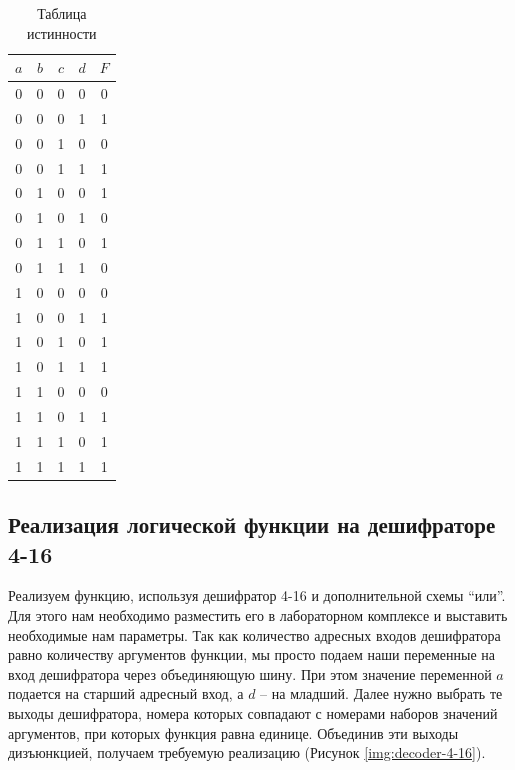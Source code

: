 \documentclass[a4paper]{article}
\begin{document}
	\begin{table}[h] 
		\begin{center}
			\begin{tabular}{ | c | c | c | c | c | }
				\hline
				$ a $ & $ b $ & $ c $ & $ d $ & $ F $ \\
				\hline
				0     & 0     & 0     & 0     & 0     \\
				\hline
				0     & 0     & 0     & 1     & 1     \\
				\hline
				0     & 0     & 1     & 0     & 0     \\
				\hline
				0     & 0     & 1     & 1     & 1     \\
				\hline
				0     & 1     & 0     & 0     & 1     \\
				\hline
				0     & 1     & 0     & 1     & 0     \\
				\hline
				0     & 1     & 1     & 0     & 1     \\
				\hline
				0     & 1     & 1     & 1     & 0     \\
				\hline
				1     & 0     & 0     & 0     & 0     \\
				\hline
				1     & 0     & 0     & 1     & 1     \\
				\hline
				1     & 0     & 1     & 0     & 1     \\
				\hline
				1     & 0     & 1     & 1     & 1     \\
				\hline
				1     & 1     & 0     & 0     & 0     \\
				\hline
				1     & 1     & 0     & 1     & 1     \\
				\hline
				1     & 1     & 1     & 0     & 1     \\
				\hline
				1     & 1     & 1     & 1     & 1     \\
				\hline
			\end{tabular}
		\end{center}
		\caption{Таблица истинности}
		\label{tab:truth}
	\end{table}
	
	\subsection{Реализация логической функции на дешифраторе 4-16}
	Реализуем функцию, используя дешифратор 4-16 и дополнительной схемы “или”. Для этого нам необходимо разместить его в лабораторном комплексе и выставить необходимые нам параметры. Так как количество адресных входов дешифратора равно количеству аргументов функции, мы просто подаем наши переменные на вход дешифратора через объединяющую шину. При этом значение переменной $ a $ подается на старший адресный вход, а $ d $ – на младший. Далее нужно выбрать те выходы дешифратора, номера которых совпадают с номерами наборов значений аргументов, при которых функция равна единице. Объединив эти выходы дизъюнкцией, получаем требуемую реализацию (Рисунок \ref{img:decoder-4-16}).
	
\end{document}

